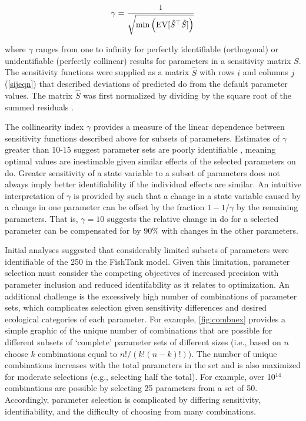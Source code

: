 \documentclass[letterpaper,12pt,oneside]{article}\usepackage[]{graphicx}\usepackage[]{color}
\begin{document}
\begin{equation} \label{gameq}
\gamma = \frac{1} {\sqrt{ \min \left(\rm{EV}[\mathit{\hat{S}}^\top \mathit{\hat{S}}]\right)}}
\end{equation}

\noindent where $\gamma$ ranges from one to infinity for perfectly identifiable (orthogonal) or unidentifiable (perfectly collinear) results for parameters in a sensitivity matrix $S$.  The sensitivity functions were supplied as a matrix $\hat{S}$ with rows $i$ and columns $j$ (\cref{sijeqn}) that described deviations of predicted \ac{do} from the default parameter values.  The matrix $\hat{S}$ was first normalized by dividing by the square root of the summed residuals \citep{Omlin01,Soetaert10}. 

The collinearity index $\gamma$ provides a measure of the linear dependence between sensitivity functions described above for subsets of parameters. Estimates of $\gamma$ greater than 10-15 suggest parameter sets are poorly identifiable \citep{Brun01,Omlin01}, meaning optimal values are inestimable given similar effects of the selected parameters on \ac{do}. Greater sensitivity of a state variable to a subset of parameters does not always imply better identifiability if the individual effects are similar.  An intuitive interpretation of $\gamma$ is provided by \citet{Brun01} such that a change in a state variable caused by a change in one parameter can be offset by the fraction $1 - 1/\gamma$ by the remaining parameters.  That is, $\gamma = 10$ suggests the relative change in \ac{do} for a selected parameter can be compensated for by 90\% with changes in the other parameters. 

Initial analyses suggested that considerably limited subsets of parameters were identifiable of the 250 in the FishTank model.  Given this limitation, parameter selection must consider the competing objectives of increased precision with parameter inclusion and reduced identifability as it relates to optimization.  An additional challenge is the excessively high number of combinations of parameter sets, which complicates selection given sensitivity differences and desired ecological categories of each parameter.  For example, \cref{fig:combnex} provides a simple graphic of the unique number of combinations that are possible for different subsets of `complete' parameter sets of different sizes (i.e., based on $n$ choose $k$ combinations equal to $n!/\left(k!\left(n-k\right)!\right)$).  The number of unique combinations increases with the total parameters in the set and is also maximized for moderate selections (e.g., selecting half the total).  For example, over 10$^{14}$ combinations are possible by selecting 25 parameters from a set of 50.  Accordingly, parameter selection is complicated by differing sensitivity, identifiability, and the difficulty of choosing from many combinations.
\end{document}

